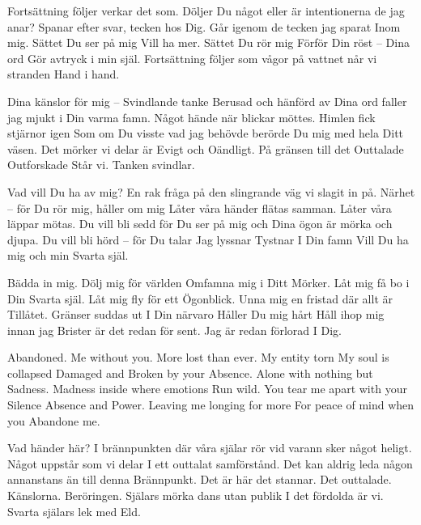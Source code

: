 \startpoem
Fortsättning följer verkar det som.
Döljer Du något eller är intentionerna
de jag anar?
Spanar efter svar,
tecken hos Dig.
Går igenom de tecken jag sparat 
Inom mig.
Sättet Du ser på mig
Vill ha mer.
Sättet Du rör mig
Förför
Din röst – Dina ord
Gör avtryck i min själ.
Fortsättning följer
som vågor på vattnet
når vi stranden
Hand i hand.
\stoppoem

\startpoem
Dina känslor för mig – 
Svindlande tanke
Berusad och hänförd av Dina ord
faller jag mjukt i Din varma famn.
Något hände när blickar möttes.
Himlen fick stjärnor igen
Som om Du visste vad jag behövde
berörde Du mig med hela 
Ditt väsen.
Det mörker vi delar är
Evigt och Oändligt.
På gränsen till det 
Outtalade
Outforskade 
Står vi.
Tanken svindlar.
\stoppoem

\startpoem
Vad vill Du ha av mig?
En rak fråga på den slingrande väg 
vi slagit in på.
Närhet – för Du rör mig, håller om mig
Låter våra händer flätas samman.
Låter våra läppar mötas.
Du vill bli sedd för Du ser på mig och
Dina ögon är mörka och djupa.
Du vill bli hörd – för Du talar
Jag lyssnar
Tystnar 
I Din famn
Vill Du ha mig och min
Svarta själ.
\stoppoem

\startpoem
Bädda in mig.
Dölj mig för världen
Omfamna mig i Ditt
Mörker.
Låt mig få bo i Din
Svarta själ.
Låt mig fly för ett 
Ögonblick.
Unna mig en fristad där allt är
Tillåtet.
Gränser suddas ut
I Din närvaro
Håller Du mig hårt
Håll ihop mig innan jag
Brister
är det redan för sent.
Jag är redan förlorad 
I Dig.
\stoppoem

\startpoem
Abandoned.
Me without you.
More lost than ever.
My entity torn
My soul is collapsed
Damaged and
Broken by your 
Absence.
Alone with nothing but
Sadness.
Madness inside where emotions
Run wild.
You tear me apart with your
Silence
Absence and 
Power.
Leaving me longing for more
For peace of mind when you
Abandone me.
\stoppoem

\startpoem
Vad händer här?
I brännpunkten där våra själar 
rör vid varann
sker något heligt.
Något uppstår som vi delar
I ett outtalat samförstånd.
Det kan aldrig leda någon annanstans än till denna
Brännpunkt.
Det är här det stannar.
Det outtalade.
Känslorna. Beröringen.
Själars mörka dans utan publik
I det fördolda är vi.
Svarta själars lek med
Eld.
\stoppoem


